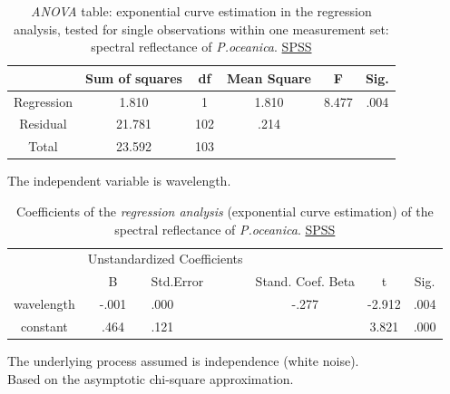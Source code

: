 \documentclass[10pt, a4paper]{article}
\begin{document}
\begin{appendices}
\begin{table}[htbp]
	\caption{\textit{ANOVA} table: exponential curve estimation in the regression analysis, tested for single observations within one measurement set: spectral reflectance of \textit{P.oceanica}. \href{http://www.spss.com/}{SPSS}}
	\begin{center}
		\begin{tabular}{|c|c|c|c| c|c|}
			\hline\hline
			& \textbf{Sum of squares} & \textbf{df} & \textbf{Mean Square} & F & Sig.\\ \hline\hline
			Regression & 1.810 & 1 & 1.810 & 8.477 & .004\\ \hline
			Residual & 21.781 & 102 & .214 & & \\ \hline
			Total & 23.592 & 103 & & & \\ \hline
		\end{tabular}
	\end{center}
	The independent variable is wavelength. 
	\label{tab:6}
\end{table}

\begin{table}[htbp]
	\caption{Coefficients of the \textit{regression analysis} (exponential curve estimation) of the spectral reflectance of \textit{P.oceanica}. \href{http://www.spss.com/}{SPSS}}
	\begin{center}
		\begin{tabular}{| c | c | p{2cm}| c | c | c |}
			\hline\hline
			& \multicolumn{2}{|c|}{Unstandardized Coefficients}\\
			\cline{2-3}
			& B & Std.Error & Stand. Coef. Beta & t & Sig.\\ \hline\hline
			wavelength & -.001 & .000 & -.277 & -2.912 & .004 \\ \hline
			constant & .464 & .121 & & 3.821 & .000 \\ \hline
		\end{tabular}
	\end{center}
	The underlying process assumed is independence (white noise).\\
	 Based on the asymptotic chi-square approximation.
	\label{tab:7}
\end{table}
\pagebreak


\end{appendices}
\end{document}
